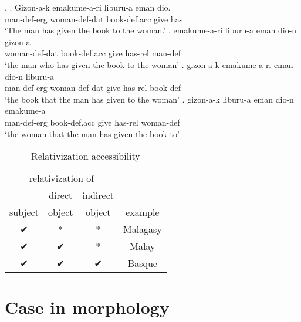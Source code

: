 \ex.
\ag. Gizon-a-k emakume-a-ri liburu-a eman dio.\\
 man-\ac{def}-\ac{erg} woman-\ac{def}-\ac{dat} book-\ac{def}.\ac{acc} give has\\
 `The man has given the book to the woman.'
\bg. emakume-a-ri liburu-a eman dio-n gizon-a\\
 woman-\ac{def}-\ac{dat} book-\ac{def}.\ac{acc} give has-\ac{rel} man-\ac{def}\\
 `the man who has given the book to the woman'
\bg. gizon-a-k emakume-a-ri eman dio-n liburu-a\\
 man-\ac{def}-\ac{erg} woman-\ac{def}-\ac{dat} give has-\ac{rel} book-\ac{def}\\
 `the book that the man has given to the woman'
\bg. gizon-a-k liburu-a eman dio-n emakume-a\\
 man-\ac{def}-\ac{erg} book-\ac{def}.\ac{acc} give has-\ac{rel} woman-\ac{def}\\
 `the woman that the man has given the book to' 




 \begin{table}[H]
   \center
   \caption {Relativization accessibility}
     \begin{tabular}{cccc}
       \toprule
             \multicolumn{3}{c}{relativization of}
           & \\
       \cmidrule{1-3}
             & direct
             & indirect
           & \\
             subject
             & object
             & object
           & example \\
       \cmidrule{1-3} \cmidrule{4-4}
             ✔
             & *
             & *
           & Malagasy \\
             ✔
             & ✔
             & *
           & Malay \\
             ✔
             & ✔
             & ✔
           & Basque \\
       \bottomrule
     \end{tabular}
 \end{table}






\section{Case in morphology}\label{sec:casemorphology}




